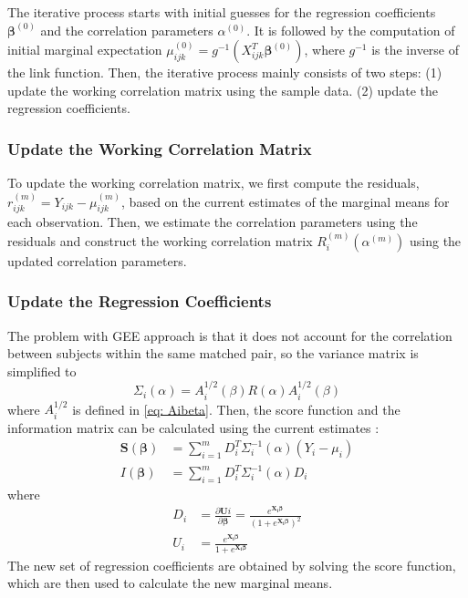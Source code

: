 \documentclass[
]{aft}
\begin{document}
The iterative process starts with initial guesses for the regression
coefficients \(\boldsymbol{\beta}^{(0)}\) and the correlation parameters
\(\alpha^{(0)}\). It is followed by the computation of initial marginal
expectation
\(\mu_{ijk}^{(0)} = g^{-1}(X_{ijk}^T \boldsymbol{\beta}^{(0)})\), where
\(g^{-1}\) is the inverse of the link function. Then, the iterative
process mainly consists of two steps: (1) update the working correlation
matrix using the sample data. (2) update the regression coefficients.

\subsubsection{Update the Working Correlation
Matrix}\label{update-the-working-correlation-matrix}

To update the working correlation matrix, we first compute the
residuals, \(r_{ijk}^{(m)} = Y_{ijk} - \mu_{ijk}^{(m)}\), based on the
current estimates of the marginal means for each observation. Then, we
estimate the correlation parameters using the residuals and construct
the working correlation matrix \(R_i^{(m)}(\alpha^{(m)})\) using the
updated correlation parameters.

\subsubsection{Update the Regression
Coefficients}\label{update-the-regression-coefficients}

The problem with GEE approach is that it does not account for the
correlation between subjects within the same matched pair, so the
variance matrix is simplified to \begin{equation}
\Sigma_i(\alpha) = A_i^{1/2}(\beta)R(\alpha)A_i^{1/2}(\beta) \label{eq:geeCovMat}
\end{equation} where \(A_i^{1/2}\) is defined in \eqref{eq: Aibeta}.
Then, the score function and the information matrix can be calculated
using the current estimates \citep{Zeger1988}: \begin{align}
\boldsymbol{S}(\boldsymbol{\beta}) &= \sum_{i=1}^m D_i^T \Sigma_i^{-1}(\alpha) (Y_i - \mu_i) \label{eq:geeScoreEqs}\\
I(\boldsymbol{\beta}) &= \sum_{i=1}^m D_i^T\Sigma_i^{-1}(\alpha)D_i \label{eq:geeInfoMat}
\end{align} where \begin{align}
D_i &= \frac{\partial \boldsymbol{U}i}{\partial \boldsymbol{\beta}} = \frac{e^{\boldsymbol{X_i\beta}}}{(1+e^{\boldsymbol{X_i\beta}})^2} \label{eq:Di}\\
U_i & = \frac{e^{\boldsymbol{X_i\beta}}}{1+e^{\boldsymbol{X_i\beta}}} \label{eq:Ui}
\end{align} The new set of regression coefficients are obtained by
solving the score function, which are then used to calculate the new
marginal means.
\end{document}
